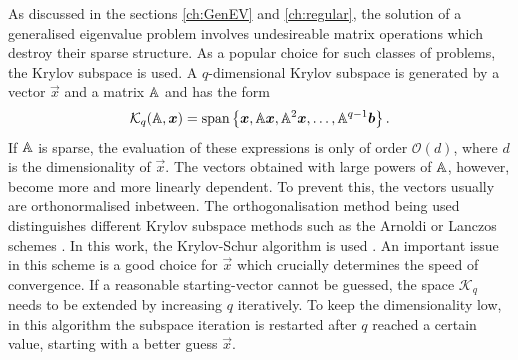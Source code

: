 As discussed in the sections \ref{ch:GenEV} and \ref{ch:regular}, the solution of a generalised eigenvalue problem involves undesireable matrix operations which destroy their sparse structure.
As a popular choice for such classes of problems, the Krylov subspace is used.
A $q$-dimensional Krylov subspace is generated by a vector $\vec{x}$ and a matrix $\mathbb{A}$ and has the form
\begin{equation}
   \mathcal{K}_q(\mathbb{A},\bm{x})=\text{span}\left\{ \bm{x},\mathbb{A}\bm{x},\mathbb{A}^2\bm{x},\hdots,\mathbb{A}^{q-1}\bm{b} \right\}.
\end{equation}
If $\mathbb{A}$ is sparse, the evaluation of these expressions is only of order $\mathcal{O}(d)$, where $d$ is the dimensionality of $\vec{x}$.
The vectors obtained with large powers of $\mathbb{A}$, however, become more and more linearly dependent.
To prevent this, the vectors usually are orthonormalised inbetween.
The orthogonalisation method being used distinguishes different Krylov subspace methods such as the Arnoldi \cite{str-4} or Lanczos schemes \cite{str-5}.
In this work, the Krylov-Schur algorithm is used \cite{str-7,KrSch}.
An important issue in this scheme is a good choice for $\vec{x}$ which crucially determines the speed of convergence.
If a reasonable starting-vector cannot be guessed, the space $\mathcal{K}_q$ needs to be extended by increasing $q$ iteratively.
To keep the dimensionality low, in this algorithm the subspace iteration is restarted after $q$ reached a certain value, starting with a better guess $\vec{x}$.

%
%
%
%
%

